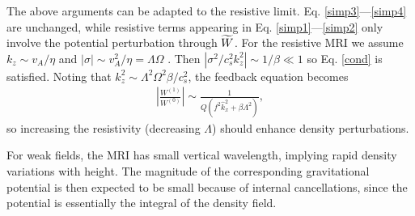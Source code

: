 
 The above arguments can be adapted to the resistive
 limit. Eq. \ref{simp3}---\ref{simp4} are unchanged, while resistive
 terms appearing in Eq. \ref{simp1}---\ref{simp2} only involve the
 potential perturbation through $\widetilde{W}$. For the resistive MRI we assume
 $k_z\sim v_A/\eta$ and $|\sigma|\sim v_A^2/\eta = \Lambda\Omega$
 \citep{sano99}. Then $|\sigma^2/c_s^2k_z^2|\sim 1/\beta \ll 1$ so
 Eq. \ref{cond} is satisfied. Noting that $k_z^2\sim
 \Lambda^2\Omega^2\beta/c_s^2$, the feedback equation becomes
 \begin{align}
   \left|\frac{W^{(1)}}{W^{(0)}}\right| \sim
   \frac{1}{Q\left(f^2\hat{k}_x^2 + \beta\Lambda^2\right)},
 \end{align}
 so increasing the resistivity (decreasing $\Lambda$) should enhance
 density perturbations. 
 

 For weak fields, the MRI has small vertical wavelength,
 implying rapid density variations with height. The magnitude of the
 corresponding gravitational potential is then expected to be small
 because of internal cancellations, since the potential is essentially
 the integral of the density field. 
